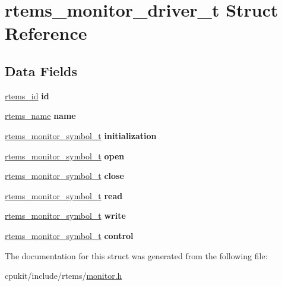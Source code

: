 \hypertarget{structrtems__monitor__driver__t}{}\section{rtems\+\_\+monitor\+\_\+driver\+\_\+t Struct Reference}
\label{structrtems__monitor__driver__t}
\subsection*{Data Fields}
\begin{DoxyCompactItemize}
\item 
\mbox{\label{structrtems__monitor__driver__t_a744501c18a353d31c903936428949acb}} 
\mbox{\hyperlink{group__ClassicTasks_gab20892b814dced7dd4e5b9bf42becd57}{rtems\+\_\+id}} {\bfseries id}
\item 
\mbox{\label{structrtems__monitor__driver__t_ac6699e824ba6fcdbcf0dacba8f0c4847}} 
\mbox{\hyperlink{group__ClassicTasks_ga55fb63c49f68c0cbd9bee004da15b1fd}{rtems\+\_\+name}} {\bfseries name}
\item 
\mbox{\label{structrtems__monitor__driver__t_afcd924bf6ef7e553191f47967e9611ca}} 
\mbox{\hyperlink{structrtems__monitor__symbol__t}{rtems\+\_\+monitor\+\_\+symbol\+\_\+t}} {\bfseries initialization}
\item 
\mbox{\label{structrtems__monitor__driver__t_a797f2dc95f5354c6cbeb94b25a1d351a}} 
\mbox{\hyperlink{structrtems__monitor__symbol__t}{rtems\+\_\+monitor\+\_\+symbol\+\_\+t}} {\bfseries open}
\item 
\mbox{\label{structrtems__monitor__driver__t_ab94f93a87a9d445d9adad87e52492d44}} 
\mbox{\hyperlink{structrtems__monitor__symbol__t}{rtems\+\_\+monitor\+\_\+symbol\+\_\+t}} {\bfseries close}
\item 
\mbox{\label{structrtems__monitor__driver__t_a9b200240e85b71b28e1e57ebed60091d}} 
\mbox{\hyperlink{structrtems__monitor__symbol__t}{rtems\+\_\+monitor\+\_\+symbol\+\_\+t}} {\bfseries read}
\item 
\mbox{\label{structrtems__monitor__driver__t_ac0a2b95a9a85b03104796521c633dab4}} 
\mbox{\hyperlink{structrtems__monitor__symbol__t}{rtems\+\_\+monitor\+\_\+symbol\+\_\+t}} {\bfseries write}
\item 
\mbox{\label{structrtems__monitor__driver__t_ae80426e0298eab48e37a9b380d231486}} 
\mbox{\hyperlink{structrtems__monitor__symbol__t}{rtems\+\_\+monitor\+\_\+symbol\+\_\+t}} {\bfseries control}
\end{DoxyCompactItemize}


The documentation for this struct was generated from the following file\+:\begin{DoxyCompactItemize}
\item 
cpukit/include/rtems/\mbox{\hyperlink{monitor_8h}{monitor.\+h}}\end{DoxyCompactItemize}
